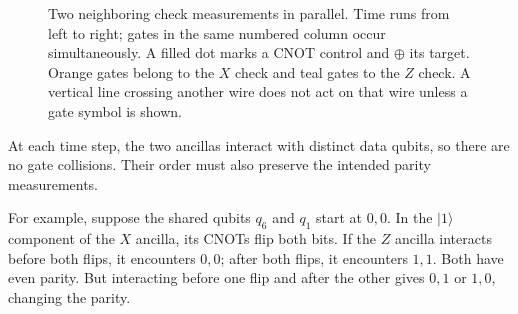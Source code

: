 \documentclass[11pt,a4paper]{article}
\begin{document}
\begin{figure}[!ht]
\centering
{}
\caption{Two neighboring check measurements in parallel.
Time runs from left to right; gates in the same numbered column
occur simultaneously. A filled dot marks a CNOT control and
$\oplus$ its target. Orange gates belong to the $X$ check and
teal gates to the $Z$ check. A vertical line crossing another
wire does not act on that wire unless a gate symbol is shown.}
\label{fig:parallel-checks}
\end{figure}

At each time step, the two ancillas interact with distinct data qubits, so there are no gate collisions. Their order must also preserve the intended parity measurements.

For example, suppose the shared qubits $q_6$ and $q_1$ start at $0,0$. In the $|1\rangle$ component of the $X$ ancilla, its CNOTs flip both bits. If the $Z$ ancilla interacts before both flips, it encounters $0,0$; after
both flips, it encounters $1,1$. Both have even parity.
But interacting before one flip and after the other gives $0,1$ or $1,0$, changing the parity.
\end{document}
